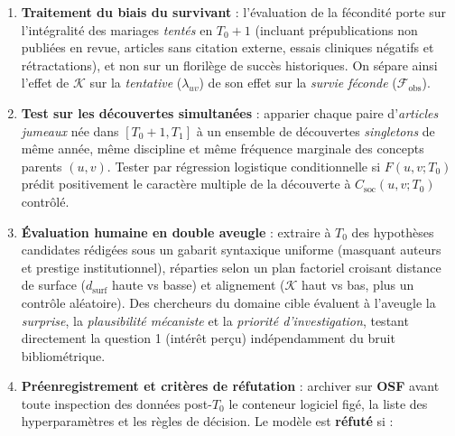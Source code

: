 \documentclass[a4paper,11pt]{article}
\providecommand{\tightlist}{\setlength{\itemsep}{0pt}\setlength{\parskip}{0pt}}
\begin{document}
\begin{enumerate}
  \begin{itemize}
  \tightlist
  \item
    \emph{B1 (Topologie locale)} : attachement préférentiel et score
    d'Adamic-Adar dans le graphe de cooccurrence.
  \item
    \emph{B2 (Cascade non structurée, H2 seule)} : score ABC de Swanson
    pondéré et similarité cosinus \(x_u(T_0)^\top x_v(T_0)\).
  \item
    \emph{B3 (Atypicité bibliométrique)} : z-score de co-citation des
    journaux d'Uzzi et al.~(2013) sans couche relationnelle
    \(\mathcal{L}_{\text{struct}}\).
  \item
    \emph{B4 (Apprentissage profond sans invariant)} : prédiction de
    liens par R-GCN standard dépourvu de contrainte d'homomorphisme
    \(\mathcal{K}\) et du terme de champ \(F\).
  \end{itemize}
\item
  \textbf{Traitement du biais du survivant} : l'évaluation de la
  fécondité porte sur l'intégralité des mariages \emph{tentés} en
  \(T_0+1\) (incluant prépublications non publiées en revue, articles
  sans citation externe, essais cliniques négatifs et rétractations), et
  non sur un florilège de succès historiques. On sépare ainsi l'effet de
  \(\mathcal{K}\) sur la \emph{tentative} (\(\lambda_{uv}\)) de son
  effet sur la \emph{survie féconde} (\(\mathcal{F}_{\text{obs}}\)).
\item
  \textbf{Test sur les découvertes simultanées} : apparier chaque paire
  d'\emph{articles jumeaux} née dans \([T_0+1, T_1]\) à un ensemble de
  découvertes \emph{singletons} de même année, même discipline et même
  fréquence marginale des concepts parents \((u,v)\). Tester par
  régression logistique conditionnelle si \(F(u,v; T_0)\) prédit
  positivement le caractère multiple de la découverte à
  \(C_{\text{soc}}(u,v; T_0)\) contrôlé.
\item
  \textbf{Évaluation humaine en double aveugle} : extraire à \(T_0\) des
  hypothèses candidates rédigées sous un gabarit syntaxique uniforme
  (masquant auteurs et prestige institutionnel), réparties selon un plan
  factoriel croisant distance de surface (\(d_{\text{surf}}\) haute vs
  basse) et alignement (\(\mathcal{K}\) haut vs bas, plus un contrôle
  aléatoire). Des chercheurs du domaine cible évaluent à l'aveugle la
  \emph{surprise}, la \emph{plausibilité mécaniste} et la \emph{priorité
  d'investigation}, testant directement la question 1 (intérêt perçu)
  indépendamment du bruit bibliométrique.
\item
  \textbf{Préenregistrement et critères de réfutation} : archiver sur
  \textbf{OSF} avant toute inspection des données post-\(T_0\) le
  conteneur logiciel figé, la liste des hyperparamètres et les règles de
  décision. Le modèle est \textbf{réfuté} si :


\end{enumerate}
\end{document}
